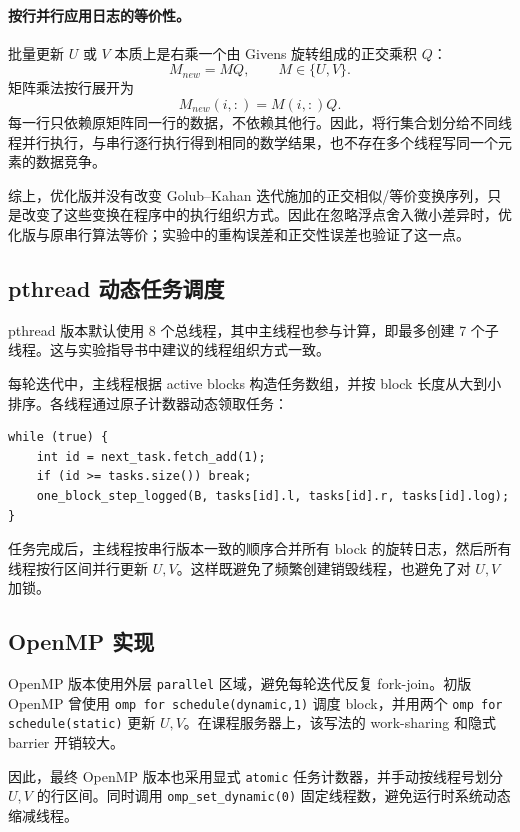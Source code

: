 ﻿\documentclass[UTF8,a4paper]{ctexart}
\begin{document}
\paragraph{按行并行应用日志的等价性。}
批量更新 $U$ 或 $V$ 本质上是右乘一个由 Givens 旋转组成的正交乘积 $Q$：
\[
  M_{new}=M Q, \qquad M\in\{U,V\}.
\]
矩阵乘法按行展开为
\[
  M_{new}(i,:) = M(i,:)Q.
\]
每一行只依赖原矩阵同一行的数据，不依赖其他行。因此，将行集合划分给不同线程并行执行，与串行逐行执行得到相同的数学结果，也不存在多个线程写同一个元素的数据竞争。

综上，优化版并没有改变 Golub--Kahan 迭代施加的正交相似/等价变换序列，只是改变了这些变换在程序中的执行组织方式。因此在忽略浮点舍入微小差异时，优化版与原串行算法等价；实验中的重构误差和正交性误差也验证了这一点。
\subsection{pthread 动态任务调度}

pthread 版本默认使用 8 个总线程，其中主线程也参与计算，即最多创建 7 个子线程。这与实验指导书中建议的线程组织方式一致。

每轮迭代中，主线程根据 active blocks 构造任务数组，并按 block 长度从大到小排序。各线程通过原子计数器动态领取任务：

\begin{lstlisting}[caption={pthread 动态任务领取思想}]
while (true) {
    int id = next_task.fetch_add(1);
    if (id >= tasks.size()) break;
    one_block_step_logged(B, tasks[id].l, tasks[id].r, tasks[id].log);
}
\end{lstlisting}

任务完成后，主线程按串行版本一致的顺序合并所有 block 的旋转日志，然后所有线程按行区间并行更新 $U,V$。这样既避免了频繁创建销毁线程，也避免了对 $U,V$ 加锁。

\subsection{OpenMP 实现}

OpenMP 版本使用外层 \texttt{parallel} 区域，避免每轮迭代反复 fork-join。初版 OpenMP 曾使用 \texttt{omp for schedule(dynamic,1)} 调度 block，并用两个 \texttt{omp for schedule(static)} 更新 $U,V$。在课程服务器上，该写法的 work-sharing 和隐式 barrier 开销较大。

因此，最终 OpenMP 版本也采用显式 \texttt{atomic} 任务计数器，并手动按线程号划分 $U,V$ 的行区间。同时调用 \texttt{omp\_set\_dynamic(0)} 固定线程数，避免运行时系统动态缩减线程。
\end{document}
